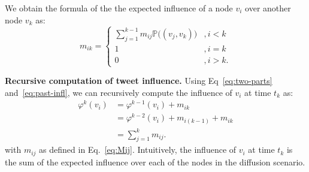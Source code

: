 We obtain the formula of the the expected influence of a node $v_i$ over another node $v_k$ as:
%
\begin{equation} \label{eq:Mij}
m_{ik}=
\left\{
\begin{array}{ll}
	\sum^{k-1}_{j=1}m_{ij}\mathds{P}\big((v_j, v_k)\big) &,i < k \\
	1 & ,i = k \\
	0 & ,i > k.
\end{array}
\right.
\end{equation} 

\textbf{Recursive computation of tweet influence.}
Using Eq~\eqref{eq:two-parts} and~\eqref{eq:past-infl}, we can recursively compute the influence of $v_i$ at time $t_k$ as:
\begin{align}
	\varphi^k(v_i) &= \varphi^{k-1}(v_i) + m_{ik} \nonumber \\
				   &= \varphi^{k-2}(v_i) + m_{i(k-1)} + m_{ik} \nonumber \\
				   &= \sum_{j=1}^k m_{ij}. 
\end{align}
with $m_{ij}$ as defined in Eq.~\eqref{eq:Mij}.
Intuitively, the influence of $v_i$ at time $t_k$ is the sum of the expected influence over each of the nodes in the diffusion scenario.


